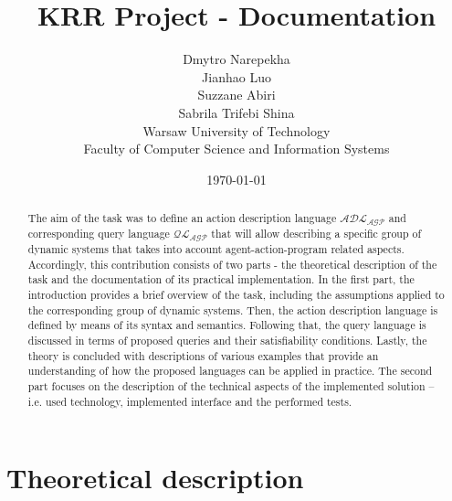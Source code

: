 \documentclass[a4paper]{article}
\begin{document}
\title{
KRR Project - Documentation {\large\linebreak\\}}
\author{
Dmytro Narepekha\\[0.1cm]
Jianhao Luo\\[0.1cm]
Suzzane Abiri\\[0.1cm]
Sabrila Trifebi Shina\\[0.1cm]
Warsaw University of Technology\\
Faculty of Computer Science and Information Systems\\
}
\date{\today}
\maketitle

\begin{abstract}
The aim of the task was to define an action description language $\mathcal{ADL_{AGP}}$ and corresponding query language $\mathcal{QL_{AGP}}$ that will allow describing a specific group of dynamic systems that takes into account agent-action-program related aspects. 
  Accordingly, this contribution consists of two parts - the theoretical description of the task and the documentation of its practical implementation. 
  In the first part, the introduction provides a brief overview of the task, including the assumptions applied to the corresponding group of dynamic systems. Then, the action description language is defined by means of its syntax and semantics. 
  Following that, the query language is discussed in terms of proposed queries and their satisfiability conditions. 
  Lastly, the theory is concluded with descriptions of various examples that provide an understanding of how the proposed languages can be applied in practice. 
  The second part focuses on the description of the technical aspects of the implemented solution -- i.e. used technology, implemented interface and the performed tests. 
\end{abstract}

\tableofcontents\label{c}
\newpage

\section{Theoretical description}
\end{document}
